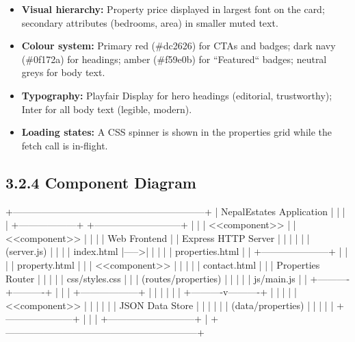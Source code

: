 \documentclass[12pt,a4paper]{report}
\begin{document}
\begin{itemize}
  \item \textbullet{} \textbf{Visual hierarchy:} Property price displayed in largest font on the card; secondary attributes (bedrooms, area) in smaller muted text.
  \item \textbullet{} \textbf{Colour system:} Primary red (\#dc2626) for CTAs and badges; dark navy (\#0f172a) for headings; amber (\#f59e0b) for ``Featured`` badges; neutral greys for body text.
  \item \textbullet{} \textbf{Typography:} Playfair Display for hero headings (editorial, trustworthy); Inter for all body text (legible, modern).
  \item \textbullet{} \textbf{Loading states:} A CSS spinner is shown in the properties grid while the fetch call is in-flight.
\end{itemize}
\subsection{3.2.4 Component Diagram}
+------------------------------------------------------------+
|                     NepalEstates Application               |
|                                                            |
|  +------------------+      +---------------------------+  |
|  |  <<component>>   |      |     <<component>>         |  |
|  |  Web Frontend    |      |   Express HTTP Server     |  |
|  |                  |      |   (server.js)             |  |
|  |  index.html      |----->|                           |  |
|  |  properties.html |      |  +---------------------+  |  |
|  |  property.html   |      |  | <<component>>       |  |  |
|  |  contact.html    |      |  | Properties Router   |  |  |
|  |  css/styles.css  |      |  | (routes/properties) |  |  |
|  |  js/main.js      |      |  +----------+----------+  |  |
|  +------------------+      |             |             |  |
|                             |  +----------v----------+  |  |
|                             |  | <<component>>       |  |  |
|                             |  | JSON Data Store     |  |  |
|                             |  | (data/properties)   |  |  |
|                             |  +---------------------+  |  |
|                             +---------------------------+  |
+------------------------------------------------------------+
\end{document}
